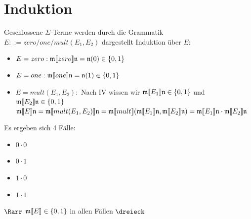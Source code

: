 \documentclass[a4paper]{article}
\begin{document}
	\section{Induktion}
		Geschlossene $\Sigma$-Terme werden durch die Grammatik $E::=zero/one/mult(E_1,E_2)$ dargestellt \newline
		Induktion über $E$:
			\begin{itemize}
				\item $E=zero:\frak{m}\llbracket zero\rrbracket\frak{n}=\frak{n}(0)\in\{0, 1\}$
				\item $E=one:\frak{m}\llbracket one\rrbracket\frak{n}=\frak{n}(1)\in\{0, 1\}$
				\item $E=mult(E_1, E_2):$ Nach IV wissen wir $\frak{m}\llbracket E_1\rrbracket\frak{n}\in\{0, 1\}$ und $\frak{m}\llbracket E_2\rrbracket\frak{n}\in\{0, 1\}$ \newline
					$\frak{m}\llbracket E\rrbracket\frak{n}=\frak{m}\llbracket mult(E_1, E_2)\rrbracket\frak{n}=\frak{m}\llbracket mult\rrbracket(\frak{m}\llbracket E_1\rrbracket\frak{n}, \frak{m}\llbracket E_2\rrbracket\frak{n}) = \frak{m}\llbracket E_1\rrbracket\frak{n} \cdot \frak{m}\llbracket E_2\rrbracket\frak{n}$	
			\end{itemize}
		Es ergeben sich 4 Fälle:
			\begin{itemize}
				\item $0 \cdot 0$
				\item $0 \cdot 1$
				\item $1 \cdot 0$
				\item $1 \cdot 1$
			\end{itemize}
		$\Rarr$ $\frak{m}\llbracket E\rrbracket\in\{0, 1\}$ in allen Fällen
		$\dreieck$
\end{document}
